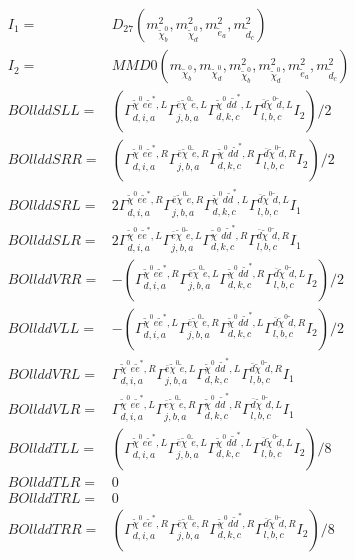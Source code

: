 \documentclass[A4,landscape]{article}
\begin{document}
\begin{align} 
I_1 = & D_{27}(m^2_{\tilde{\chi}^0_{{b}}}, m^2_{\tilde{\chi}^0_{{d}}}, m^2_{\tilde{e}_{{a}}}, m^2_{\tilde{d}_{{c}}}) \\ 
I_2 = & MMD0(m_{\tilde{\chi}^0_{{b}}}, m_{\tilde{\chi}^0_{{d}}}, m^2_{\tilde{\chi}^0_{{b}}}, m^2_{\tilde{\chi}^0_{{d}}}, m^2_{\tilde{e}_{{a}}}, m^2_{\tilde{d}_{{c}}}) \\ 
  BOllddSLL= & ( \Gamma^{\tilde{\chi}^0 e \tilde{e}^*,L}_{d, i, a} \Gamma^{\bar{e}\tilde{\chi}^0 \tilde{e} ,L}_{j, b, a} \Gamma^{\tilde{\chi}^0 d \tilde{d}^*,L}_{d, k, c} \Gamma^{\bar{d}\tilde{\chi}^0 \tilde{d} ,L}_{l, b, c} I_2)/2 \\ 
  BOllddSRR= & ( \Gamma^{\tilde{\chi}^0 e \tilde{e}^*,R}_{d, i, a} \Gamma^{\bar{e}\tilde{\chi}^0 \tilde{e} ,R}_{j, b, a} \Gamma^{\tilde{\chi}^0 d \tilde{d}^*,R}_{d, k, c} \Gamma^{\bar{d}\tilde{\chi}^0 \tilde{d} ,R}_{l, b, c} I_2)/2 \\ 
  BOllddSRL= & 2  \Gamma^{\tilde{\chi}^0 e \tilde{e}^*,R}_{d, i, a} \Gamma^{\bar{e}\tilde{\chi}^0 \tilde{e} ,R}_{j, b, a} \Gamma^{\tilde{\chi}^0 d \tilde{d}^*,L}_{d, k, c} \Gamma^{\bar{d}\tilde{\chi}^0 \tilde{d} ,L}_{l, b, c} I_1 \\ 
  BOllddSLR= & 2  \Gamma^{\tilde{\chi}^0 e \tilde{e}^*,L}_{d, i, a} \Gamma^{\bar{e}\tilde{\chi}^0 \tilde{e} ,L}_{j, b, a} \Gamma^{\tilde{\chi}^0 d \tilde{d}^*,R}_{d, k, c} \Gamma^{\bar{d}\tilde{\chi}^0 \tilde{d} ,R}_{l, b, c} I_1 \\ 
  BOllddVRR= & -( \Gamma^{\tilde{\chi}^0 e \tilde{e}^*,R}_{d, i, a} \Gamma^{\bar{e}\tilde{\chi}^0 \tilde{e} ,L}_{j, b, a} \Gamma^{\tilde{\chi}^0 d \tilde{d}^*,R}_{d, k, c} \Gamma^{\bar{d}\tilde{\chi}^0 \tilde{d} ,L}_{l, b, c} I_2)/2 \\ 
  BOllddVLL= & -( \Gamma^{\tilde{\chi}^0 e \tilde{e}^*,L}_{d, i, a} \Gamma^{\bar{e}\tilde{\chi}^0 \tilde{e} ,R}_{j, b, a} \Gamma^{\tilde{\chi}^0 d \tilde{d}^*,L}_{d, k, c} \Gamma^{\bar{d}\tilde{\chi}^0 \tilde{d} ,R}_{l, b, c} I_2)/2 \\ 
  BOllddVRL= &  \Gamma^{\tilde{\chi}^0 e \tilde{e}^*,R}_{d, i, a} \Gamma^{\bar{e}\tilde{\chi}^0 \tilde{e} ,L}_{j, b, a} \Gamma^{\tilde{\chi}^0 d \tilde{d}^*,L}_{d, k, c} \Gamma^{\bar{d}\tilde{\chi}^0 \tilde{d} ,R}_{l, b, c} I_1 \\ 
  BOllddVLR= &  \Gamma^{\tilde{\chi}^0 e \tilde{e}^*,L}_{d, i, a} \Gamma^{\bar{e}\tilde{\chi}^0 \tilde{e} ,R}_{j, b, a} \Gamma^{\tilde{\chi}^0 d \tilde{d}^*,R}_{d, k, c} \Gamma^{\bar{d}\tilde{\chi}^0 \tilde{d} ,L}_{l, b, c} I_1 \\ 
  BOllddTLL= & ( \Gamma^{\tilde{\chi}^0 e \tilde{e}^*,L}_{d, i, a} \Gamma^{\bar{e}\tilde{\chi}^0 \tilde{e} ,L}_{j, b, a} \Gamma^{\tilde{\chi}^0 d \tilde{d}^*,L}_{d, k, c} \Gamma^{\bar{d}\tilde{\chi}^0 \tilde{d} ,L}_{l, b, c} I_2)/8 \\ 
  BOllddTLR= & 0 \\ 
  BOllddTRL= & 0 \\ 
  BOllddTRR= & ( \Gamma^{\tilde{\chi}^0 e \tilde{e}^*,R}_{d, i, a} \Gamma^{\bar{e}\tilde{\chi}^0 \tilde{e} ,R}_{j, b, a} \Gamma^{\tilde{\chi}^0 d \tilde{d}^*,R}_{d, k, c} \Gamma^{\bar{d}\tilde{\chi}^0 \tilde{d} ,R}_{l, b, c} I_2)/8 \\ 
\end{align} 
\end{document}
